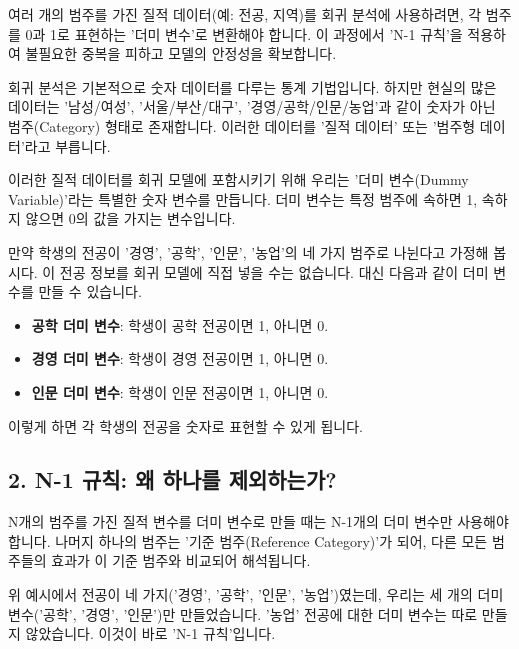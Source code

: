 \documentclass[11pt,a4paper]{book}
\theoremstyle{definition}
\begin{document}
\begin{tcolorbox}[definition={핵심 요약: 다중 범주 더미 변수}]
여러 개의 범주를 가진 질적 데이터(예: 전공, 지역)를 회귀 분석에 사용하려면, 각 범주를 0과 1로 표현하는 '더미 변수'로 변환해야 합니다. 이 과정에서 'N-1 규칙'을 적용하여 불필요한 중복을 피하고 모델의 안정성을 확보합니다.
\end{tcolorbox}

회귀 분석은 기본적으로 숫자 데이터를 다루는 통계 기법입니다. 하지만 현실의 많은 데이터는 '남성/여성', '서울/부산/대구', '경영/공학/인문/농업'과 같이 숫자가 아닌 범주(Category) 형태로 존재합니다. 이러한 데이터를 '질적 데이터' 또는 '범주형 데이터'라고 부릅니다.

이러한 질적 데이터를 회귀 모델에 포함시키기 위해 우리는 '더미 변수(Dummy Variable)'라는 특별한 숫자 변수를 만듭니다. 더미 변수는 특정 범주에 속하면 1, 속하지 않으면 0의 값을 가지는 변수입니다.

\begin{examplebox}[title={예시: 전공 데이터를 더미 변수로 변환}]
만약 학생의 전공이 '경영', '공학', '인문', '농업'의 네 가지 범주로 나뉜다고 가정해 봅시다. 이 전공 정보를 회귀 모델에 직접 넣을 수는 없습니다. 대신 다음과 같이 더미 변수를 만들 수 있습니다.

\begin{itemize}
    \item \textbf{공학 더미 변수}: 학생이 공학 전공이면 1, 아니면 0.
    \item \textbf{경영 더미 변수}: 학생이 경영 전공이면 1, 아니면 0.
    \item \textbf{인문 더미 변수}: 학생이 인문 전공이면 1, 아니면 0.
\end{itemize}
이렇게 하면 각 학생의 전공을 숫자로 표현할 수 있게 됩니다.
\end{examplebox}

\subsection{2. N-1 규칙: 왜 하나를 제외하는가?}

\begin{tcolorbox}[definition={핵심 요약: N-1 규칙}]
N개의 범주를 가진 질적 변수를 더미 변수로 만들 때는 N-1개의 더미 변수만 사용해야 합니다. 나머지 하나의 범주는 '기준 범주(Reference Category)'가 되어, 다른 모든 범주들의 효과가 이 기준 범주와 비교되어 해석됩니다.
\end{tcolorbox}

위 예시에서 전공이 네 가지('경영', '공학', '인문', '농업')였는데, 우리는 세 개의 더미 변수('공학', '경영', '인문')만 만들었습니다. '농업' 전공에 대한 더미 변수는 따로 만들지 않았습니다. 이것이 바로 'N-1 규칙'입니다.
\end{document}
